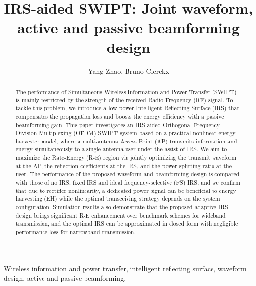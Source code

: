 \documentclass[journal]{IEEEtran}
\begin{document}
	\title{IRS-aided SWIPT: Joint waveform, active and passive beamforming design}
	\author{Yang Zhao, Bruno Clerckx}

	\maketitle

	\begin{abstract}
		The performance of Simultaneous Wireless Information and Power Transfer (SWIPT) is mainly restricted by the strength of the received Radio-Frequency (RF) signal. To tackle this problem, we introduce a low-power Intelligent Reflecting Surface (IRS) that compensates the propagation loss and boosts the energy efficiency with a passive beamforming gain. This paper investigates an IRS-aided Orthogonal Frequency Division Multiplexing (OFDM) SWIPT system based on a practical nonlinear energy harvester model, where a multi-antenna Access Point (AP) transmits information and energy simultaneously to a single-antenna user under the assist of IRS. We aim to maximize the Rate-Energy (R-E) region via jointly optimizing the transmit waveform at the AP, the reflection coefficients at the IRS, and the power splitting ratio at the user. The performance of the proposed waveform and beamforming design is compared with those of no IRS, fixed IRS and ideal frequency-selective (FS) IRS, and we confirm that due to rectifier nonlinearity, a dedicated power signal can be beneficial to energy harvesting (EH) while the optimal transceiving strategy depends on the system configuration. Simulation results also demonstrate that the proposed adaptive IRS design brings significant R-E enhancement over benchmark schemes for wideband transmission, and the optimal IRS can be approximated in closed form with negligible performance loss for narrowband transmission.
	\end{abstract}


	\begin{IEEEkeywords}
		Wireless information and power transfer, intelligent reflecting surface, waveform design, active and passive beamforming.
	\end{IEEEkeywords}
\end{document}
